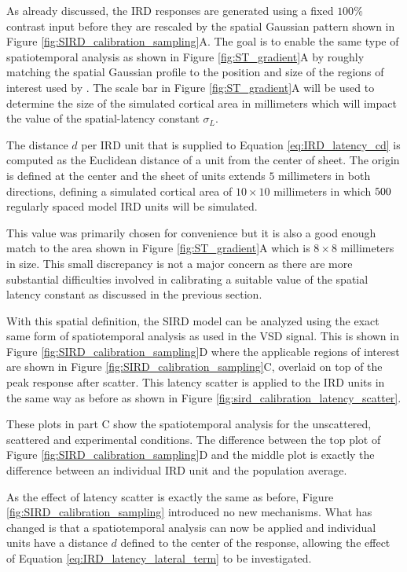 \documentclass[phd,ianc,twoside]{infthesis}
\begin{document}
As already discussed, the IRD responses are generated using a fixed
$100\%$ contrast input before they are rescaled by the spatial Gaussian
pattern shown in Figure \ref{fig:SIRD_calibration_sampling}A. The goal
is to enable the same type of spatiotemporal analysis as shown in Figure
\ref{fig:ST_gradient}A by roughly matching the spatial Gaussian profile
to the position and size of the regions of interest used by
\citet{sit_neuron09}. The scale bar in Figure \ref{fig:ST_gradient}A
will be used to determine the size of the simulated cortical area in
millimeters which will impact the value of the spatial-latency constant
$\sigma_L$.

The distance $d$ per IRD unit that is supplied to Equation
\ref{eq:IRD_latency_cd} is computed as the Euclidean distance of a unit
from the center of sheet. The origin is defined at the center and the
sheet of units extends $5$ millimeters in both directions, defining a
simulated cortical area of $10\times10$ millimeters in which
$500\time500$ regularly spaced model IRD units will be simulated.

This value was primarily chosen for convenience but it is also a good
enough match to the area shown in Figure \ref{fig:ST_gradient}A which is
$8\times8$ millimeters in size. This small discrepancy is not a major
concern as there are more substantial difficulties involved in
calibrating a suitable value of the spatial latency constant as
discussed in the previous section.

With this spatial definition, the SIRD model can be analyzed using the
exact same form of spatiotemporal analysis as used in the VSD
signal. This is shown in Figure \ref{fig:SIRD_calibration_sampling}D
where the applicable regions of interest are shown in Figure
\ref{fig:SIRD_calibration_sampling}C, overlaid on top of the peak
response after scatter. This latency scatter is applied to the IRD units
in the same way as before as shown in Figure
\ref{fig:sird_calibration_latency_scatter}.

These plots in part C show the spatiotemporal analysis for the
unscattered, scattered and experimental conditions. The difference
between the top plot of Figure \ref{fig:SIRD_calibration_sampling}D and
the middle plot is exactly the difference between an individual IRD unit
and the population average.

As the effect of latency scatter is exactly the same as before, Figure
\ref{fig:SIRD_calibration_sampling} introduced no new mechanisms. What
has changed is that a spatiotemporal analysis can now be applied and
individual units have a distance $d$ defined to the center of the
response, allowing the effect of Equation
\ref{eq:IRD_latency_lateral_term} to be investigated.
\end{document}
